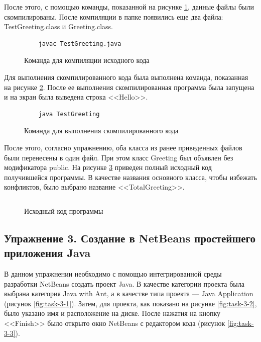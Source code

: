 \documentclass[a4paper, 14pt]{extarticle}
\begin{document}
После этого, с помощью команды, показанной на рисунке \ref{fig:task-2-3}, данные
файлы были скомпилированы. После компиляции в папке появились еще два файла:
\foreignlanguage{english}{TestGreeting.class} и
\foreignlanguage{english}{Greeting.class}.

\begin{figure}[H]
  \centering
  \begin{verbatim}
    javac TestGreeting.java
  \end{verbatim}
  \caption{Команда для компиляции исходного кода}
  \label{fig:task-2-3}
\end{figure}

Для выполнения скомпилированного кода была выполнена команда, показанная на
рисунке \ref{fig:task-2-4}. После ее выполнения скомпилированная программа была
запущена и на экран была выведена строка <<Hello>>.

\begin{figure}[H]
  \centering
  \begin{verbatim}
    java TestGreeting
  \end{verbatim}
  \caption{Команда для выполнения скомпилированного кода}
  \label{fig:task-2-4}
\end{figure}

После этого, согласно упражнению, оба класса из ранее приведенных файлов были
перенесены в один файл. При этом класс \foreignlanguage{english}{Greeting} был
объявлен без модификатора \foreignlanguage{english}{public}. На рисунке
\ref{fig:task-2-5} приведен полный исходный код получившейся программы. В
качестве названия основного класса, чтобы избежать конфликтов, было выбрано
название <<\foreignlanguage{english}{TotalGreeting}>>.

\begin{figure}[H]
  \inputminted{java}{../code/task-2/TotalGreeting.java}
  \caption{Исходный код программы}
  \label{fig:task-2-5}
\end{figure}

\subsection*{Упражнение 3. Создание в NetBeans простейшего приложения Java}

В данном упражнении необходимо с помощью интегрированной среды разработки
NetBeans создать проект Java. В качестве категории проекта была выбрана категория
\foreignlanguage{english}{Java with Ant}, а в качестве типа проекта ---
\foreignlanguage{english}{Java Application} (рисунок \ref{fig:task-3-1}). Затем,
для проекта, как показано на рисунке \ref{fig:task-3-2}, было указано имя и
расположение на диске. После нажатия на кнопку
<<\foreignlanguage{english}{Finish}>> было открыто окно NetBeans с редактором
кода (рисунок \ref{fig:task-3-3}).
\end{document}

